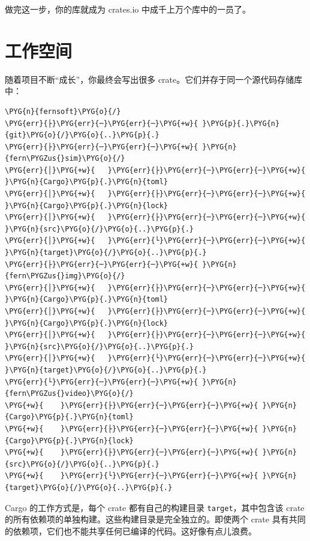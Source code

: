 做完这一步，你的库就成为 crates.io 中成千上万个库中的一员了。

\section{工作空间}

随着项目不断“成长”，你最终会写出很多 crate。它们并存于同一个源代码存储库中：

\begin{Verbatim}[commandchars=\\\{\},breaklines=true,breakanywhere=true,fontsize=\codefont,xleftmargin=17bp]
\PYG{n}{fernsoft}\PYG{o}{/}
\PYG{err}{├}\PYG{err}{─}\PYG{err}{─}\PYG{+w}{ }\PYG{p}{.}\PYG{n}{git}\PYG{o}{/}\PYG{o}{..}\PYG{p}{.}
\PYG{err}{├}\PYG{err}{─}\PYG{err}{─}\PYG{+w}{ }\PYG{n}{fern\PYGZus{}sim}\PYG{o}{/}
\PYG{err}{│}\PYG{+w}{   }\PYG{err}{├}\PYG{err}{─}\PYG{err}{─}\PYG{+w}{ }\PYG{n}{Cargo}\PYG{p}{.}\PYG{n}{toml}
\PYG{err}{│}\PYG{+w}{   }\PYG{err}{├}\PYG{err}{─}\PYG{err}{─}\PYG{+w}{ }\PYG{n}{Cargo}\PYG{p}{.}\PYG{n}{lock}
\PYG{err}{│}\PYG{+w}{   }\PYG{err}{├}\PYG{err}{─}\PYG{err}{─}\PYG{+w}{ }\PYG{n}{src}\PYG{o}{/}\PYG{o}{..}\PYG{p}{.}
\PYG{err}{│}\PYG{+w}{   }\PYG{err}{└}\PYG{err}{─}\PYG{err}{─}\PYG{+w}{ }\PYG{n}{target}\PYG{o}{/}\PYG{o}{..}\PYG{p}{.}
\PYG{err}{├}\PYG{err}{─}\PYG{err}{─}\PYG{+w}{ }\PYG{n}{fern\PYGZus{}img}\PYG{o}{/}
\PYG{err}{│}\PYG{+w}{   }\PYG{err}{├}\PYG{err}{─}\PYG{err}{─}\PYG{+w}{ }\PYG{n}{Cargo}\PYG{p}{.}\PYG{n}{toml}
\PYG{err}{│}\PYG{+w}{   }\PYG{err}{├}\PYG{err}{─}\PYG{err}{─}\PYG{+w}{ }\PYG{n}{Cargo}\PYG{p}{.}\PYG{n}{lock}
\PYG{err}{│}\PYG{+w}{   }\PYG{err}{├}\PYG{err}{─}\PYG{err}{─}\PYG{+w}{ }\PYG{n}{src}\PYG{o}{/}\PYG{o}{..}\PYG{p}{.}
\PYG{err}{│}\PYG{+w}{   }\PYG{err}{└}\PYG{err}{─}\PYG{err}{─}\PYG{+w}{ }\PYG{n}{target}\PYG{o}{/}\PYG{o}{..}\PYG{p}{.}
\PYG{err}{└}\PYG{err}{─}\PYG{err}{─}\PYG{+w}{ }\PYG{n}{fern\PYGZus{}video}\PYG{o}{/}
\PYG{+w}{    }\PYG{err}{├}\PYG{err}{─}\PYG{err}{─}\PYG{+w}{ }\PYG{n}{Cargo}\PYG{p}{.}\PYG{n}{toml}
\PYG{+w}{    }\PYG{err}{├}\PYG{err}{─}\PYG{err}{─}\PYG{+w}{ }\PYG{n}{Cargo}\PYG{p}{.}\PYG{n}{lock}
\PYG{+w}{    }\PYG{err}{├}\PYG{err}{─}\PYG{err}{─}\PYG{+w}{ }\PYG{n}{src}\PYG{o}{/}\PYG{o}{..}\PYG{p}{.}
\PYG{+w}{    }\PYG{err}{└}\PYG{err}{─}\PYG{err}{─}\PYG{+w}{ }\PYG{n}{target}\PYG{o}{/}\PYG{o}{..}\PYG{p}{.}
\end{Verbatim}

Cargo 的工作方式是，每个 crate 都有自己的构建目录 \texttt{target}，其中包含该 crate 的所有依赖项的单独构建。这些构建目录是完全独立的。即使两个 crate 具有共同的依赖项，它们也不能共享任何已编译的代码。这好像有点儿浪费。


